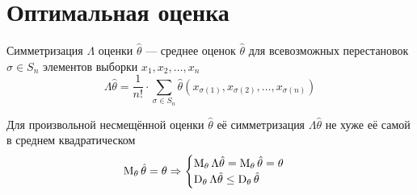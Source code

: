 \section{Оптимальная оценка}
\begin{definition}[Симметризация]
  Симметризация $\Lambda$ оценки $\hat{\theta}$ --- среднее
  оценок $\hat{\theta}$ для
  всевозможных перестановок $\sigma\in S_n$
  элементов выборки $x_1, x_2, \dots, x_n$
  $$\Lambda\hat{\theta}
      =\frac{1}{n!}\cdot\sum_{\sigma\in S_n} \hat{\theta}\left(
      x_{\sigma\left(1\right)}, x_{\sigma\left(2\right)},
          \dots, x_{\sigma\left(n\right)}\right)$$
\end{definition}
\begin{lemma}
  Для произвольной несмещённой оценки $\hat{\theta}$
  её симметризация $\Lambda{\hat{\theta}}$
  не хуже её самой в среднем квадратическом
  \begin{align*}
  \operatorname{M}_{\theta} \hat{\theta}
      =\theta
  \Rightarrow
      \begin{cases}
      \operatorname{M}_{\theta} \Lambda{\hat{\theta}}
          =\operatorname{M}_{\theta} \hat{\theta}
          =\theta\\
      \operatorname{D}_{\theta} \Lambda{\hat{\theta}}
          \le\operatorname{D}_{\theta} \hat{\theta}
      \end{cases}
  \end{align*}
\end{lemma}

